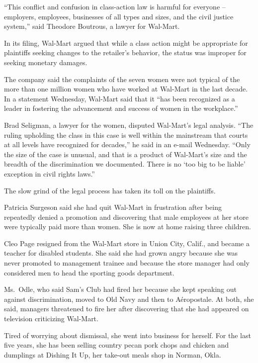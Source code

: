 ﻿\documentclass[12pt]{article}
\begin{document}
``This conflict and confusion in class-action law is harmful for everyone -- employers, employees,
businesses of all types and sizes, and the civil justice system,'' said Theodore Boutrous, a lawyer
for Wal-Mart.

In its filing, Wal-Mart argued that while a class action might be appropriate for plaintiffs seeking
changes to the retailer's behavior, the status was improper for seeking monetary damages.

The company said the complaints of the seven women were not typical of the more than one million
women who have worked at Wal-Mart in the last decade. In a statement Wednesday, Wal-Mart said that
it ``has been recognized as a leader in fostering the advancement and success of women in the
workplace.''

Brad Seligman, a lawyer for the women, disputed Wal-Mart's legal analysis. ``The ruling upholding
the class in this case is well within the mainstream that courts at all levels have recognized for
decades,'' he said in an e-mail Wednesday. ``Only the size of the case is unusual, and that is a
product of Wal-Mart's size and the breadth of the discrimination we documented. There is no `too big
to be liable' exception in civil rights laws.''

The slow grind of the legal process has taken its toll on the plaintiffs.

Patricia Surgeson said she had quit Wal-Mart in frustration after being repeatedly denied a
promotion and discovering that male employees at her store were typically paid more than women. She
is now at home raising three children.

Cleo Page resigned from the Wal-Mart store in Union City, Calif., and became a teacher for disabled
students. She said she had grown angry because she was never promoted to management trainee and
because the store manager had only considered men to head the sporting goods department.

Ms.~Odle, who said Sam's Club had fired her because she kept speaking out against discrimination,
moved to Old Navy and then to A\'eropostale. At both, she said, managers threatened to fire her
after discovering that she had appeared on television criticizing Wal-Mart.

Tired of worrying about dismissal, she went into business for herself. For the last five years, she
has been selling country pecan pork chops and chicken and dumplings at Dishing It Up, her take-out
meals shop in Norman, Okla.
\end{document}
